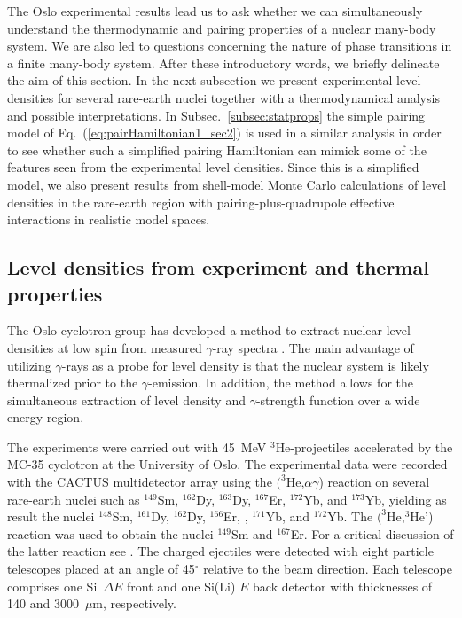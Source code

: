 \documentclass[rmp,aps,floatfix]{revtex4}
\begin{document}
The Oslo experimental results lead us to ask whether we can simultaneously
understand the thermodynamic and pairing properties of a nuclear many-body
system. We are also led to questions concerning the nature of phase 
transitions in a finite many-body system.  
After these introductory words, we briefly delineate the aim of this
section. 
In the next subsection we present experimental level densities for several
rare-earth nuclei together with a thermodynamical analysis and possible
interpretations. 
In Subsec.~\ref{subsec:statprops} the simple pairing model
of Eq.~(\ref{eq:pairHamiltonian1_sec2}) is used in a similar analysis
in order to see whether such a simplified pairing Hamiltonian can mimick
some of the features seen from the experimental level densities.
Since this is a simplified model, we also present results from
shell-model Monte Carlo calculations of level densities 
in the rare-earth region with pairing-plus-quadrupole effective interactions 
in realistic model spaces.


\subsection{Level densities from experiment and thermal properties}

The Oslo cyclotron group has developed a method to 
extract nuclear level densities at low spin from 
measured $\gamma$-ray spectra 
\cite{oslo2,oslo3,schiller2001,oslo1,andreas2000}. 
The main advantage of utilizing $\gamma$-rays as a probe for 
level density is that the nuclear system is likely thermalized prior 
to the $\gamma$-emission. In addition, the method 
allows for the simultaneous extraction of level density 
and $\gamma$-strength function over a wide energy region. 

The experiments were carried out with 45~MeV $^3$He-projectiles 
accelerated by the MC-35 cyclotron at the University of 
Oslo. The experimental data were recorded with the CACTUS multidetector 
array using the $(^3$He,$\alpha \gamma$)
reaction on several rare-earth nuclei such as 
$^{149}$Sm, 
$^{162}$Dy, $^{163}$Dy, $^{167}$Er, 
$^{172}$Yb, and $^{173}$Yb, yielding as result the nuclei
 $^{148}$Sm,  
$^{161}$Dy, $^{162}$Dy, $^{166}$Er, , $^{171}$Yb, and $^{172}$Yb.
The $(^3$He,$^3$He')
reaction was used to obtain the nuclei $^{149}$Sm and $^{167}$Er. 
For a critical discussion of the latter reaction see 
\cite{andreasheherect}.
The charged ejectiles were detected with eight particle telescopes placed 
at an angle of 45$^{\circ}$ relative to the beam direction. 
Each telescope comprises one Si~$\Delta E$ front and one Si(Li) $E$ 
back detector with thicknesses of 140 and 3000~$\mu$m, respectively. 
\end{document}
